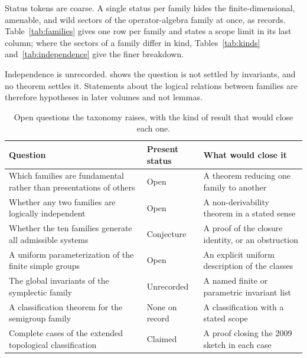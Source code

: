 \documentclass[11pt,letterpaper]{article}
\theoremstyle{definition}
\theoremstyle{remark}
\begin{document}
Status tokens are coarse. A single status per family hides the finite-dimensional, amenable, and wild sectors of the operator-algebra family at once, as  records. Table~\ref{tab:families} gives one row per family and states a scope limit in its last column; where the sectors of a family differ in kind, Tables~\ref{tab:kinds} and~\ref{tab:independence} give the finer breakdown.

Independence is unrecorded.  shows the question is not settled by invariants, and no theorem settles it. Statements about the logical relations between families are therefore hypotheses in later volumes and not lemmas.

\begin{table}[ht]
\centering
\small
\caption{Open questions the taxonomy raises, with the kind of result that would close each one.}
\label{tab:open}
\begin{tabularx}{\textwidth}{L{0.34\textwidth} L{0.20\textwidth} X}
\toprule
Question & Present status & What would close it \\
\midrule
Which families are fundamental rather than presentations of others & Open & A theorem reducing one family to another \\
Whether any two families are logically independent & Open & A non-derivability theorem in a stated sense \\
Whether the ten families generate all admissible systems & Conjecture & A proof of the closure identity, or an obstruction \\
A uniform parameterization of the finite simple groups & Open & An explicit uniform description of the classes \\
The global invariants of the symplectic family & Unrecorded & A named finite or parametric invariant list \\
A classification theorem for the semigroup family & None on record & A classification with a stated scope \\
Complete cases of the extended topological classification & Claimed & A proof closing the 2009 sketch in each case \\
\bottomrule
\end{tabularx}
\end{table}
\end{document}
